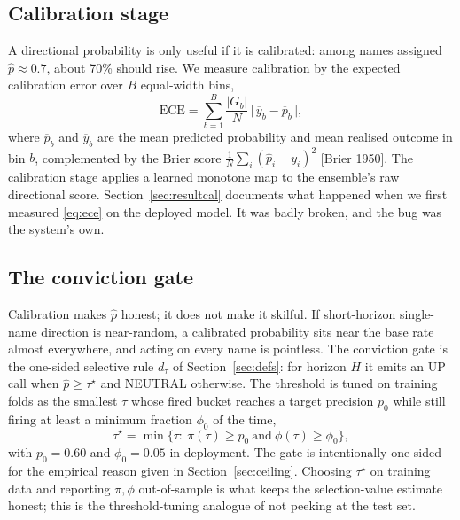 \documentclass[10pt,a4paper,oneside]{article}
\theoremstyle{definition}
\theoremstyle{plain}
\newcommand{\ece}{\mathrm{ECE}}
\newcommand{\Pup}{\hat p}
\begin{document}
\subsection{Calibration stage}
\label{sec:cal}
A directional probability is only useful if it is calibrated: among names assigned
$\Pup\approx0.7$, about 70\% should rise. We measure calibration by the expected
calibration error over $B$ equal-width bins,
\begin{equation}
\label{eq:ece}
\ece=\sum_{b=1}^{B}\frac{|G_b|}{N}\,\big|\,\overline{y}_b-\overline{p}_b\,\big|,
\end{equation}
where $\overline{p}_b$ and $\overline{y}_b$ are the mean predicted probability and mean
realised outcome in bin $b$, complemented by the Brier score
$\tfrac1N\sum_i(\Pup_i-y_i)^2$ [Brier 1950]. The calibration stage applies a learned
monotone map to the ensemble's raw directional score. Section~\ref{sec:resultcal}
documents what happened when we first measured \eqref{eq:ece} on the deployed model.
It was badly broken, and the bug was the system's own.

\subsection{The conviction gate}
\label{sec:gate}
Calibration makes $\Pup$ honest; it does not make it skilful. If short-horizon
single-name direction is near-random, a calibrated probability sits near the base rate
almost everywhere, and acting on every name is pointless. The conviction gate is the
one-sided selective rule $d_\tau$ of Section~\ref{sec:defs}: for horizon $H$ it emits
an UP call when $\Pup\ge\tau^\star$ and NEUTRAL otherwise. The threshold is tuned on
training folds as the smallest $\tau$ whose fired bucket reaches a target precision
$p_0$ while still firing at least a minimum fraction $\phi_0$ of the time,
\begin{equation}
\label{eq:tau}
\tau^\star=\min\big\{\tau:\ \pi(\tau)\ge p_0\ \text{and}\ \phi(\tau)\ge\phi_0\big\},
\end{equation}
with $p_0=0.60$ and $\phi_0=0.05$ in deployment. The gate is intentionally one-sided
for the empirical reason given in Section~\ref{sec:ceiling}. Choosing $\tau^\star$ on
training data and reporting $\pi,\phi$ out-of-sample is what keeps the selection-value
estimate honest; this is the threshold-tuning analogue of not peeking at the test set.
\end{document}
